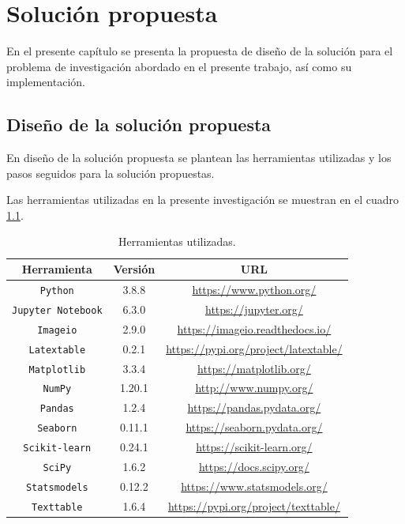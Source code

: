 \chapter{Solución propuesta}

En el presente capítulo se presenta la propuesta de diseño de la solución para el problema de investigación abordado en el presente trabajo, así como su implementación.

\section{Diseño de la solución propuesta} \label{Diseño de la solución propuesta}
En diseño de la solución propuesta se plantean las herramientas utilizadas y los pasos seguidos para la solución propuestas.

Las herramientas utilizadas en la presente investigación se muestran en el cuadro \ref{tab:Herramientas utilizadas}.

\begin{table}[H]
	{\centering
		\caption{Herramientas utilizadas.}
		\begin{tabular}{|c|c|c|}
			\hline 
			Herramienta & Versión & URL\\
			\hline
			\texttt{Python} & 3.8.8 & \url{https://www.python.org/}\\
			\hline
			\texttt{Jupyter Notebook} & 6.3.0 & \url{https://jupyter.org/}\\
			\hline
			\texttt{Imageio} & 2.9.0 & \url{https://imageio.readthedocs.io/}\\
			\hline
			\texttt{Latextable} & 0.2.1 & \url{https://pypi.org/project/latextable/}\\
			\hline
			\texttt{Matplotlib} & 3.3.4 & \url{https://matplotlib.org/}\\
			\hline
			\texttt{NumPy} & 1.20.1 & \url{http://www.numpy.org/}\\
			\hline
			\texttt{Pandas} & 1.2.4 & \url{https://pandas.pydata.org/}\\
			\hline
			\texttt{Seaborn} & 0.11.1 & \url{https://seaborn.pydata.org/}\\
			\hline
			\texttt{Scikit-learn} & 0.24.1 & \url{https://scikit-learn.org/}\\
			\hline
			\texttt{SciPy} & 1.6.2 & \url{https://docs.scipy.org/}\\
			\hline
			\texttt{Statsmodels} & 0.12.2 & \url{https://www.statsmodels.org/}\\
			\hline
			\texttt{Texttable} & 1.6.4 & \url{https://pypi.org/project/texttable/}\\
			\hline
		\end{tabular}
		
	\label{tab:Herramientas utilizadas}
	}
\end{table}

